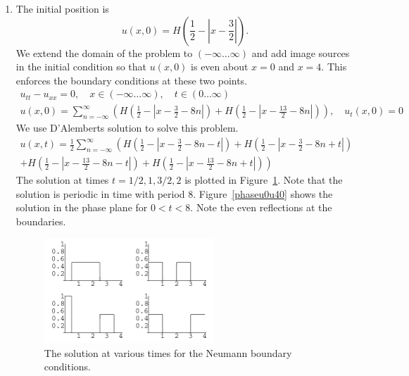 {\begin{Solution}
\begin{enumerate}
  \item
    The initial position is 
    \[
    u(x,0) = H \left( \frac{1}{2} - \left| x - \frac{3}{2} \right| \right).
    \]
    We extend the domain of the problem to $(-\infty \ldots \infty)$ and add image sources 
    in the initial condition so that $u(x,0)$ is even about $x = 0$ and 
    $x = 4$.  This enforces the boundary conditions at these two points.
    \begin{gather*}
      u_{t t} - u_{x x} = 0, \quad x \in (-\infty \ldots \infty), \quad t \in (0 \ldots \infty)
      \\
      u(x,0) = \sum_{n = - \infty}^\infty \left(
        H \left( \frac{1}{2} - \left| x - \frac{3}{2}  - 8 n \right| \right)
        + H \left( \frac{1}{2} - \left| x - \frac{13}{2}  - 8 n \right| \right)
      \right), \quad
      u_t(x,0) = 0
    \end{gather*}
    We use D'Alemberts solution to solve this problem.
    \begin{multline*}
      u(x,t) = \frac{1}{2} \sum_{n = - \infty}^\infty \left(
        H \left( \frac{1}{2} - \left| x - \frac{3}{2}  - 8 n - t \right| \right)
        + H \left( \frac{1}{2} - \left| x - \frac{3}{2}  - 8 n + t \right| \right)
      \right.
      \\
      \left.
        + H \left( \frac{1}{2} - \left| x - \frac{13}{2}  - 8 n - t \right| \right)
        + H \left( \frac{1}{2} - \left| x - \frac{13}{2}  - 8 n + t \right| \right)
      \right)
    \end{multline*}
    The solution at times $t = 1/2, 1, 3/2, 2$ is plotted in 
    Figure~\ref{ux0ux40}.
    Note that the solution is periodic in time with period $8$.  
    Figure~\ref{phaseu0u40} shows the solution in the phase plane for 
    $0 < t < 8$.  Note the even reflections at the boundaries.
    \begin{figure}[h!]
      \begin{center}
        \includegraphics[width=0.6\textwidth]{pde/waves/ux0ux40}
      \end{center}
      \caption{The solution at various times for the Neumann boundary 
        conditions.}
      \label{ux0ux40}
    \end{figure}
  \end{enumerate}



\end{Solution}}
